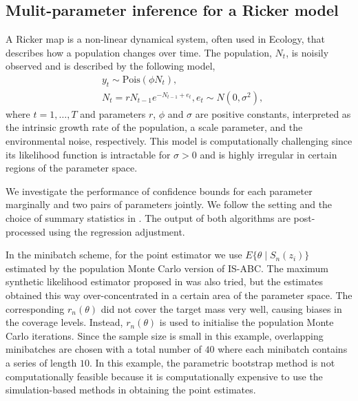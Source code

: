 \subsection{Mulit-parameter inference for a Ricker model}\label{sec:ricker}
A Ricker map is a non-linear dynamical system, often used in Ecology, that describes how a population changes over time. The population, $N_t$, is noisily observed and is described by the following model,
\begin{align*}
	& y_t \sim \mbox{Pois}(\phi N_t),\\
	& N_t = r N_{t-1}e^{-N_{t-1}+e_t}, e_t\sim N(0,\sigma^2),
\end{align*}
where $t=1,\ldots,T$ and parameters $r$, $\phi$ and $\sigma$ are positive constants, interpreted as the intrinsic growth rate of the population, a scale parameter, and the environmental noise, respectively. This model is computationally challenging since its likelihood function is intractable for $\sigma > 0$ and is highly irregular in certain regions of the parameter space. 

We investigate the performance of confidence bounds for each parameter marginally and two pairs of parameters jointly. We follow the setting and the choice of summary statistics in \cite{wood2010statistical}. The output of both algorithms are post-processed using the regression adjustment.  

In the minibatch scheme, for the point estimator we use $E\{\theta\mid S_n(z_i)\}$ estimated by the population Monte Carlo version of IS-ABC. 
The maximum synthetic likelihood estimator proposed in \cite{wood2010statistical} was also tried, but the estimates obtained this way over-concentrated in a certain area of the parameter space. The 
corresponding $r_n(\theta)$ did not cover the target mass very well, causing biases in the coverage levels. Instead, $r_n(\theta)$ is used to initialise the population Monte Carlo iterations. Since the sample size is small in this example, overlapping minibatches are chosen with a total number of $40$ where each minibatch contains a series of  length $10$. In this example, the parametric bootstrap method is not computationally feasible because it is computationally expensive to use the simulation-based methods in obtaining the point estimates.

